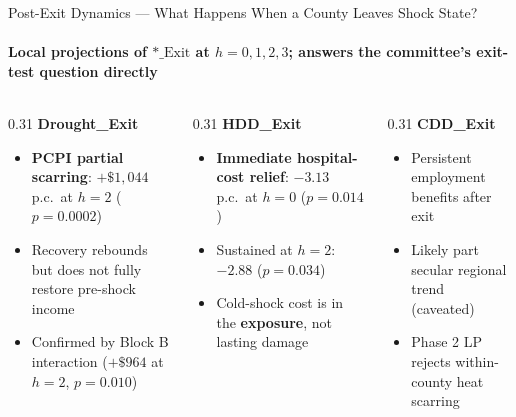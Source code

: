 \documentclass[aspectratio=169,11pt]{beamer}
\newcommand{\emphcolor}[1]{{\color{WarmOrange}\textbf{#1}}}
\newcommand{\tealtext}[1]{{\color{Teal}#1}}
\begin{document}
\begin{frame}{Post-Exit Dynamics --- What Happens When a County Leaves Shock State?}
  \framesubtitle{Local projections of \(*\_\text{Exit}\) at \(h=0,1,2,3\); answers the committee's exit-test question directly}
  \begin{columns}[T]
    \begin{column}{0.31\textwidth}
      \textbf{\tealtext{Drought\_Exit}}
      \begin{itemize}\itemsep0.12em
        \item \emphcolor{PCPI partial scarring}: \(+\$1{,}044\) p.c.\ at \(h=2\) (\(p=0.0002\))
        \item Recovery rebounds but does not fully restore pre-shock income
        \item Confirmed by Block B interaction (\(+\$964\) at \(h=2\), \(p=0.010\))
      \end{itemize}
    \end{column}
    \begin{column}{0.31\textwidth}
      \textbf{\tealtext{HDD\_Exit}}
      \begin{itemize}\itemsep0.12em
        \item \emphcolor{Immediate hospital-cost relief}: \(-3.13\) p.c.\ at \(h=0\) (\(p=0.014\))
        \item Sustained at \(h=2\): \(-2.88\) (\(p=0.034\))
        \item Cold-shock cost is in the \emphcolor{exposure}, not lasting damage
      \end{itemize}
    \end{column}
    \begin{column}{0.31\textwidth}
      \textbf{\tealtext{CDD\_Exit}}
      \begin{itemize}\itemsep0.12em
        \item Persistent employment benefits after exit
        \item Likely part secular regional trend (caveated)
        \item Phase 2 LP rejects within-county heat scarring
      \end{itemize}
    \end{column}
  \end{columns}
\end{frame}
\end{document}
